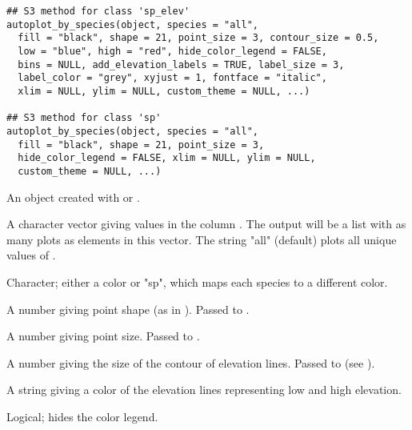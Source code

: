 \documentclass[a4paper]{book}
\begin{document}
%
\begin{Usage}
\begin{verbatim}
## S3 method for class 'sp_elev'
autoplot_by_species(object, species = "all",
  fill = "black", shape = 21, point_size = 3, contour_size = 0.5,
  low = "blue", high = "red", hide_color_legend = FALSE,
  bins = NULL, add_elevation_labels = TRUE, label_size = 3,
  label_color = "grey", xyjust = 1, fontface = "italic",
  xlim = NULL, ylim = NULL, custom_theme = NULL, ...)

## S3 method for class 'sp'
autoplot_by_species(object, species = "all",
  fill = "black", shape = 21, point_size = 3,
  hide_color_legend = FALSE, xlim = NULL, ylim = NULL,
  custom_theme = NULL, ...)
\end{verbatim}
\end{Usage}
%
\begin{Arguments}
\begin{ldescription}
\item[\code{object}] An object created with  or .

\item[\code{species}] A character vector giving values in the column . The
output will be a list with as many plots as elements in this vector.
The string "all" (default) plots all unique values of .

\item[\code{fill}] Character; either a color or "sp", which maps each species to a
different color.

\item[\code{shape}] A number giving point shape (as in ). Passed
to .

\item[\code{point\_size}] A number giving point size. Passed to
.

\item[\code{contour\_size}] A number giving the size of the contour of elevation
lines. Passed to  (see ).

\item[\code{low, high}] A string giving a color of the elevation lines representing
low and high elevation.

\item[\code{hide\_color\_legend}] Logical;  hides the color legend.


\end{ldescription}
\end{Arguments}
\end{document}
